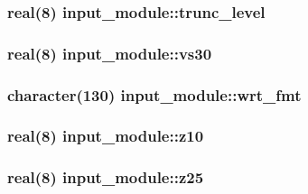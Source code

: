 \subsubsection[{trunc\+\_\+level}]{\setlength{\rightskip}{0pt plus 5cm}real(8) input\+\_\+module\+::trunc\+\_\+level}\label{namespaceinput__module_ae5dd4121bdb07e96089cd081a3017dd9}
\hypertarget{namespaceinput__module_a1c64f18e0ac52016bea961845fd4f11e}{}
\subsubsection[{vs30}]{\setlength{\rightskip}{0pt plus 5cm}real(8) input\+\_\+module\+::vs30}\label{namespaceinput__module_a1c64f18e0ac52016bea961845fd4f11e}
\hypertarget{namespaceinput__module_ae257590e746cae45e031d04017cf76d1}{}
\subsubsection[{wrt\+\_\+fmt}]{\setlength{\rightskip}{0pt plus 5cm}character(130) input\+\_\+module\+::wrt\+\_\+fmt}\label{namespaceinput__module_ae257590e746cae45e031d04017cf76d1}
\hypertarget{namespaceinput__module_aa9efcd8b3636531d8be863c73c607ba7}{}
\subsubsection[{z10}]{\setlength{\rightskip}{0pt plus 5cm}real(8) input\+\_\+module\+::z10}\label{namespaceinput__module_aa9efcd8b3636531d8be863c73c607ba7}
\hypertarget{namespaceinput__module_a397fb4f34e05ebd010c3a545e29b8eb3}{}
\subsubsection[{z25}]{\setlength{\rightskip}{0pt plus 5cm}real(8) input\+\_\+module\+::z25}\label{namespaceinput__module_a397fb4f34e05ebd010c3a545e29b8eb3}
